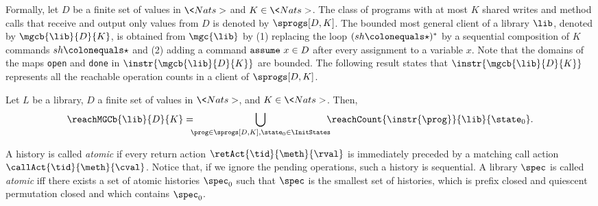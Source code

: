 

Formally, let $D$ be a finite set of values in $\<Nats>$ and $K\in\<Nats>$. The class of {\simple} programs with at most $K$ shared writes and method calls that receive and output only values from $D$ is denoted by $\sprogs[D,K]$. The bounded most general client of a library $\lib$, denoted by $\mgcb{\lib}{D}{K}$, is obtained from $\mgc{\lib}$ by (1) replacing the loop $(sh\colonequals \star)^*$ by a sequential composition of $K$ commands $sh\colonequals \star$ and (2) adding a command ${\tt assume}\ x\in D$ after every assignment to a variable $x$. 
Note that the domains of the maps {\tt open} and {\tt done} in $\instr{\mgcb{\lib}{D}{K}}$ are bounded. %
The following result states that $\instr{\mgcb{\lib}{D}{K}}$ represents all the reachable operation counts in a client of $\sprogs[D,K]$.

 
\begin{proposition}
Let $L$ be a library, $D$ a finite set of values in $\<Nats>$, and $K\in\<Nats>$. Then,
\[
\reachMGCb{\lib}{D}{K}=
\hspace{-2mm}\bigcup_{\prog\in\sprogs[D,K],\state_0\in\InitStates}
\hspace{-2mm}\reachCount{\instr{\prog}}{\lib}{\state_0}.
\]%
\end{proposition}

A history is called \emph{atomic} if every return action $\retAct{\tid}{\meth}{\rval}$ is immediately preceded by a matching call action 
 $\callAct{\tid}{\meth}{\cval}$. Notice that, if we ignore the pending operations, such a history is sequential.
A library $\spec$ is called \emph{atomic} iff there exists a set of atomic histories $\spec_0$ such that $\spec$ is the smallest set of histories, which is prefix closed and quiescent permutation closed and which contains $\spec_0$.

